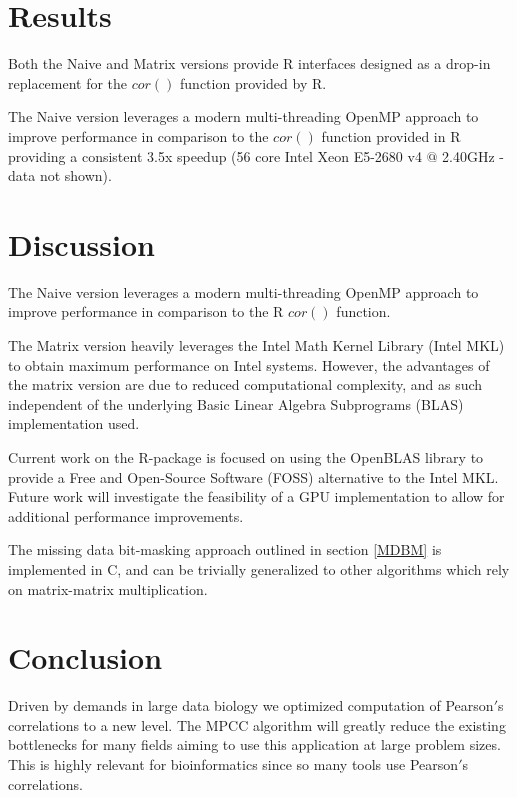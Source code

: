 \documentclass{bioinfo}
\begin{document}
\section{Results}
Both the Naive and Matrix versions provide R interfaces designed as a drop-in 
replacement for the $cor()$ function provided by R.

The Naive version leverages a modern multi-threading OpenMP approach 
to improve performance in comparison to the $cor()$ function provided 
in R providing a consistent 3.5x speedup (56 core Intel Xeon E5-2680 
v4 $@$ 2.40GHz - data not shown). 

\vspace*{-6pt}

\section{Discussion}
The Naive version leverages a modern multi-threading OpenMP approach 
to improve performance in comparison to the R $cor()$ function.

The Matrix version heavily leverages the Intel\textregistered{} Math Kernel 
Library (Intel\textregistered{} MKL) to obtain maximum performance 
on Intel\textregistered{} systems. However, the advantages of the 
matrix version are due to reduced computational complexity, and as 
such independent of the underlying Basic Linear Algebra Subprograms 
(BLAS) implementation used.

Current work on the R-package is focused on using the OpenBLAS 
library to provide a Free and Open-Source Software (FOSS) 
alternative to the Intel\textregistered{} MKL. Future work will 
investigate the feasibility of a GPU implementation to allow 
for additional performance improvements.

The missing data bit-masking approach outlined in section \ref{MDBM} 
is implemented in C, and can be trivially generalized to other 
algorithms which rely on matrix-matrix multiplication. \vspace*{-12pt}

\section{Conclusion}

Driven by demands in large data biology we optimized computation of Pearson$'$s 
correlations to a new level. The MPCC algorithm will greatly reduce the 
existing bottlenecks for many fields aiming to use this application at large 
problem sizes. This is highly relevant for bioinformatics since so many 
tools use Pearson$'$s correlations. 
\end{document}
